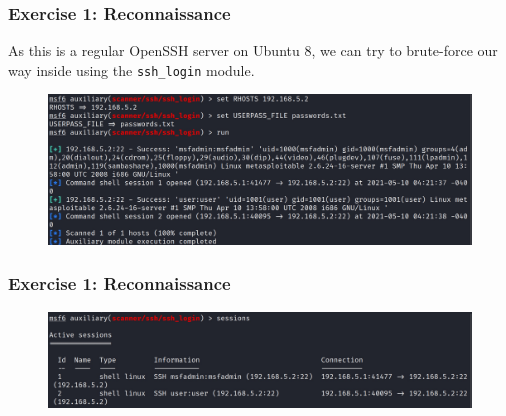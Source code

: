 \documentclass[handout]{beamer}
\begin{document}
\begin{frame}
    \frametitle{Exercise 1: Reconnaissance}
    As this is a regular OpenSSH server on Ubuntu 8, we can try to brute-force our way inside using the \texttt{ssh\_login} module.
    
	\begin{figure}
		\centering
		\includegraphics[width=\textwidth]{../drawable/exercise_1_screenshots/es1-brutessh.jpg}
	\end{figure}
\end{frame}

\begin{frame}
    \frametitle{Exercise 1: Reconnaissance}
    
    
	\begin{figure}
		\centering
		\includegraphics[width=\textwidth]{../drawable/exercise_1_screenshots/es1-sshsessions.jpg}
	\end{figure}
	
\end{frame}
\end{document}
